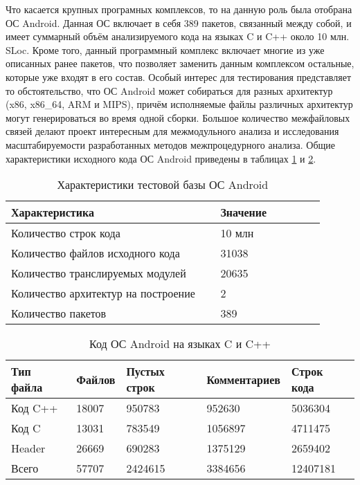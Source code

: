 Что касается крупных програмных комплексов, то на данную роль была отобрана ОС Android. Данная ОС включает в себя 389 пакетов, связанный между собой, и имеет суммарный объём анализируемого кода на языках C и C++ около 10 млн. SLoc. Кроме того, данный программный комплекс включает многие из уже описанных ранее пакетов, что позволяет заменить данным комплексом остальные, которые уже входят в его состав. Особый интерес для тестирования представляет то обстоятельство, что ОС Android может собираться для разных архитектур (x86, x86\_64, ARM и MIPS), причём  исполняемые файлы различных архитектур могут генерироваться во время одной сборки. Большое количество межфайловых связей делают проект интересным для межмодульного анализа и исследования масштабируемости разработанных методов межпроцедурного анализа. Общие характеристики исходного кода ОС Android приведены в таблицах \ref{table:android-char} и \ref{table:android-code}.

\begin{table} [htbp]
  \centering
  \parbox{15cm}{\caption{Характеристики тестовой базы ОС Android}\label{table:android-char}}
  \begin{tabular}{| p{0.6\linewidth} || p{0.3\linewidth} |}
  \hline
  \hline
  Характеристика   & Значение \\
  \hline
  \hline
  Количество строк кода   & 10 млн \\
  \hline
  Количество файлов исходного кода      & 31038    \\
  \hline
  Количество транслируемых модулей  & 20635   \\
  \hline
  Количество архитектур на построение & 2   \\
  \hline
  Количество пакетов & 389 \\
  \hline
  \hline
  \end{tabular}
\end{table}

\begin{table} [htbp]
  \centering
  \parbox{15cm}{\caption{Код ОС Android на языках C и C++}\label{table:android-code}}
  \begin{tabular}{| l | l | l | l | l |}
  \hline
  \hline
  Тип файла   & Файлов   & Пустых строк   & Комментариев & Строк кода \\
  \hline
  \hline
  Код C++                  & 18007  & 950783     &    952630   &   5036304 \\
  \hline
  Код C                    & 13031  & 783549     &   1056897   &   4711475 \\
  \hline
  Header                   & 26669  & 690283     &    1375129  &   2659402 \\
  \hline
  Всего                    & 57707  & 2424615    &    3384656  &   12407181 \\
  \hline
  \hline
  \end{tabular}
\end{table}

